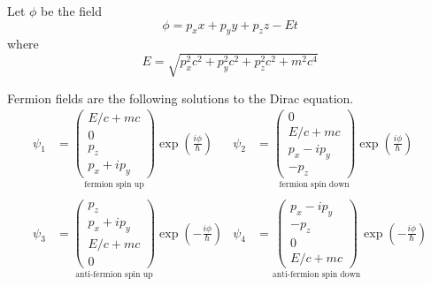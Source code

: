 \documentclass[12pt]{article}
\begin{document}
Let $\phi$ be the field
\begin{equation*}
\phi=p_xx+p_yy+p_zz-Et
\end{equation*}
where
\begin{equation*}
E=\sqrt{p_x^2c^2+p_y^2c^2+p_z^2c^2+m^2c^4}
\end{equation*}

Fermion fields are the following solutions to the Dirac equation.
\begin{align*}
\psi_1&=\underset{\text{fermion spin up}}{\begin{pmatrix}E/c+mc\\0\\p_z\\p_x+ip_y\end{pmatrix}}
\exp\left(\frac{i\phi}{\hbar}\right)
& \psi_2&=\underset{\text{fermion spin down}}{\begin{pmatrix}0\\E/c+mc\\p_x-ip_y\\-p_z\end{pmatrix}}
\exp\left(\frac{i\phi}{\hbar}\right)
\\
\\
\psi_3&=\underset{\text{anti-fermion spin up}}{\begin{pmatrix}p_z\\p_x+ip_y\\E/c+mc\\0\end{pmatrix}}
\exp\left(-\frac{i\phi}{\hbar}\right)
& \psi_4&=\underset{\text{anti-fermion spin down}}{\begin{pmatrix}p_x-ip_y\\-p_z\\0\\E/c+mc\end{pmatrix}}
\exp\left(-\frac{i\phi}{\hbar}\right)
\end{align*}
\end{document}
